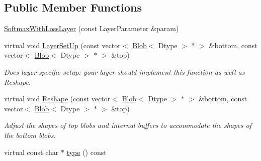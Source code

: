 \subsection*{Public Member Functions}
\begin{DoxyCompactItemize}
\item 
\hyperlink{classcaffe_1_1SoftmaxWithLossLayer_ac3a01d6846a9b62c1790635d53185e81}{Softmax\+With\+Loss\+Layer} (const Layer\+Parameter \&param)
\item 
virtual void \hyperlink{classcaffe_1_1SoftmaxWithLossLayer_a063c4e9786bc09f4773cb082c2960eb5}{Layer\+Set\+Up} (const vector$<$ \hyperlink{classcaffe_1_1Blob}{Blob}$<$ Dtype $>$ $\ast$ $>$ \&bottom, const vector$<$ \hyperlink{classcaffe_1_1Blob}{Blob}$<$ Dtype $>$ $\ast$ $>$ \&top)
\begin{DoxyCompactList}\small\item\em Does layer-\/specific setup\+: your layer should implement this function as well as Reshape. \end{DoxyCompactList}\item 
virtual void \hyperlink{classcaffe_1_1SoftmaxWithLossLayer_a9571f4e391a85f1b8b03aecbc47c298a}{Reshape} (const vector$<$ \hyperlink{classcaffe_1_1Blob}{Blob}$<$ Dtype $>$ $\ast$ $>$ \&bottom, const vector$<$ \hyperlink{classcaffe_1_1Blob}{Blob}$<$ Dtype $>$ $\ast$ $>$ \&top)
\begin{DoxyCompactList}\small\item\em Adjust the shapes of top blobs and internal buffers to accommodate the shapes of the bottom blobs. \end{DoxyCompactList}\item 
virtual const char $\ast$ \hyperlink{classcaffe_1_1SoftmaxWithLossLayer_a4aeab1a09695afcf694c1fc3c394c5d8}{type} () const \hypertarget{classcaffe_1_1SoftmaxWithLossLayer_a4aeab1a09695afcf694c1fc3c394c5d8}{}\label{classcaffe_1_1SoftmaxWithLossLayer_a4aeab1a09695afcf694c1fc3c394c5d8}


\end{DoxyCompactItemize}
